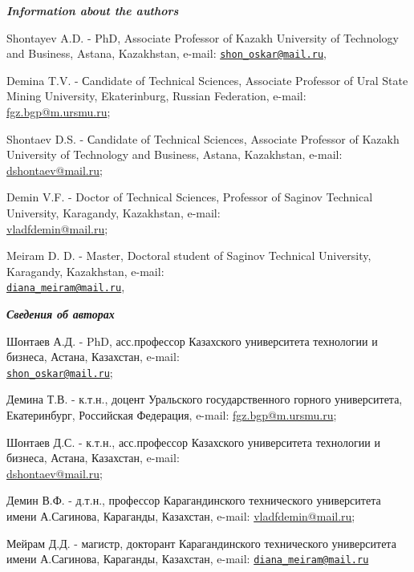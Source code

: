 \begin{authorinfo}
\emph{{\bfseries Information about the authors}}

Shontayev A.D. - PhD, Associate Professor of Kazakh University of
Technology and Business, Astana, Kazakhstan, e-mail: \href{mailto:shon_oskar@mail.ru}{\nolinkurl{shon\_oskar@mail.ru}},

Demina T.V. - Сandidate of Technical Sciences, Associate Professor of
Ural State Mining University, Ekaterinburg, Russian Federation, 
e-mail: \href{mailto:baiz76@mail.ru}{fgz.bgp@m.ursmu.ru};

Shontaev D.S. - Сandidate of Technical Sciences, Associate Professor of
Kazakh University of Technology and Business, Astana, Kazakhstan, 
e-mail: \href{mailto:baiz76@mail.ru}{dshontaev@mail.ru};

Demin V.F. - Doctor of Technical Sciences, Professor of Saginov
Technical University, Karagandy, Kazakhstan, 
e-mail: \\\href{mailto:diana_meiram@mail.ru}{vladfdemin@mail.ru};

Meiram D. D. - Master, Doctoral student of Saginov Technical University,
Karagandy, Kazakhstan, e-mail: \\\href{mailto:diana_meiram@mail.ru}{\nolinkurl{diana\_meiram@mail.ru}},

\emph{{\bfseries Сведения об авторах}}

Шонтаев А.Д. - PhD, асс.профессор Казахского университета технологии и
бизнеса, Астана, Казахстан,
e-mail: \\\href{mailto:shon_oskar@mail.ru}{\nolinkurl{shon\_oskar@mail.ru}};

Демина Т.В. - к.т.н., доцент Уральского государственного горного
университета, Екатеринбург, Российская Федерация,  e-mail: \href{mailto:baiz76@mail.ru}{fgz.bgp@m.ursmu.ru};

Шонтаев Д.С. - к.т.н., асс.профессор Казахского университета технологии
и бизнеса, Астана, Казахстан, 
e-mail: \\\href{mailto:baiz76@mail.ru}{dshontaev@mail.ru};

Демин В.Ф. - д.т.н., профессор Карагандинского технического университета
имени А.Сагинова, Караганды, Казахстан, 
e-mail: \href{mailto:diana_meiram@mail.ru}{vladfdemin@mail.ru};

Мейрам Д.Д. - магистр, докторант Карагандинского технического
университета имени А.Сагинова, Караганды, Казахстан, 
e-mail: \href{mailto:diana_meiram@mail.ru}{\nolinkurl{diana\_meiram@mail.ru}}\
\end{authorinfo}
